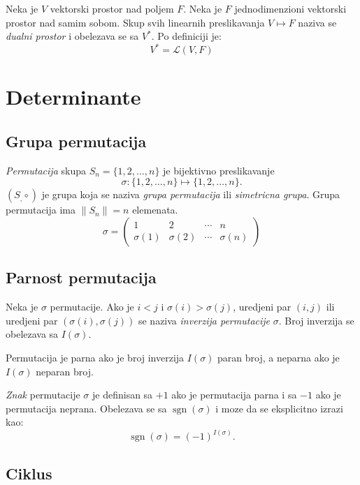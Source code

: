 \documentclass[12p,a4paper]{article}
\DeclareMathOperator{\sgn}{sgn}
\begin{document}
\begin{multicols}{2}
   Neka je $V$ vektorski prostor nad poljem $F$. Neka je $F$ jednodimenzioni 
   vektorski prostor nad samim sobom. Skup svih linearnih preslikavanja 
   $V \mapsto F$ naziva se \textit{dualni prostor} i obelezava se sa $V^*$. Po 
   definiciji je:
   \[V^* = \mathcal{L} (V, F)\]


\section{Determinante}

\subsection{Grupa permutacija}

    \textit{Permutacija} skupa $S_n = \{1, 2, \ldots, n\}$ je bijektivno 
    preslikavanje
    \[\sigma : \{1, 2, \ldots, n\} \mapsto \{1, 2, \ldots, n\}.\]
    $(S_, \circ)$ je grupa koja se naziva \textit{grupa permutacija} ili
    \textit{simetricna grupa}. Grupa permutacija ima $\| S_n \| = n$ 
    elemenata.
    \[
        \sigma = 
        \begin{pmatrix}
            1 & 2 & \cdots & n \\
            \sigma(1) & \sigma(2) & \cdots & \sigma(n)
        \end{pmatrix}
    \]

\subsection{Parnost permutacija}

    Neka je $\sigma$ permutacije. Ako je $i < j$ i $\sigma(i) > \sigma(j)$, 
    uredjeni par $(i, j)$ ili uredjeni par $(\sigma(i), \sigma(j))$ se naziva 
    \textit{inverzija permutacije} $\sigma$. Broj inverzija se obelezava sa 
    $I(\sigma)$.

    Permutacija je parna ako je broj inverzija $I(\sigma)$ paran broj, a 
    neparna ako je $I(\sigma)$ neparan broj.

    \textit{Znak} permutacije $\sigma$ je definisan sa $+1$ ako je permutacija 
    parna i sa $-1$ ako je permutacija neprana. Obelezava se sa $\sgn(\sigma)$
    i moze da se eksplicitno izrazi kao:
    \[\sgn({\sigma}) = {(-1)}^{I(\sigma)}.\]

\subsection{Ciklus}


\end{multicols}
\end{document}
